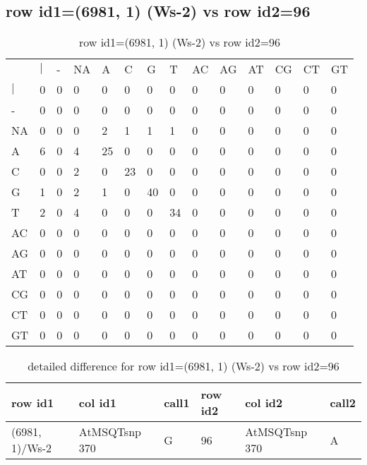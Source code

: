 \subsection{row id1=(6981, 1) (Ws-2) vs row id2=96}
\begin{center}
\begin{longtable}{|l|l|l|l|l|l|l|l|l|l|l|l|l|l|}
\caption{row id1=(6981, 1) (Ws-2) vs row id2=96} \label{table_dm210}\\
\hline
\\
\hline
&$|$&-&NA&A&C&G&T&AC&AG&AT&CG&CT&GT\\
$|$&0&0&0&0&0&0&0&0&0&0&0&0&0\\
-&0&0&0&0&0&0&0&0&0&0&0&0&0\\
NA&0&0&0&2&1&1&1&0&0&0&0&0&0\\
A&6&0&4&25&0&0&0&0&0&0&0&0&0\\
C&0&0&2&0&23&0&0&0&0&0&0&0&0\\
G&1&0&2&1&0&40&0&0&0&0&0&0&0\\
T&2&0&4&0&0&0&34&0&0&0&0&0&0\\
AC&0&0&0&0&0&0&0&0&0&0&0&0&0\\
AG&0&0&0&0&0&0&0&0&0&0&0&0&0\\
AT&0&0&0&0&0&0&0&0&0&0&0&0&0\\
CG&0&0&0&0&0&0&0&0&0&0&0&0&0\\
CT&0&0&0&0&0&0&0&0&0&0&0&0&0\\
GT&0&0&0&0&0&0&0&0&0&0&0&0&0\\
\hline
\end{longtable}
\end{center}

\begin{center}
\begin{longtable}{|l|l|l|l|l|l|}
\caption{detailed difference for row id1=(6981, 1) (Ws-2) vs row id2=96} \label{table_dm211}\\
\hline
row id1&col id1&call1&row id2&col id2&call2\\
\hline
(6981, 1)/Ws-2&AtMSQTsnp 370&G&96&AtMSQTsnp 370&A\\
\hline
\end{longtable}
\end{center}

